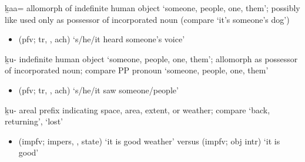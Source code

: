 \begin{morphdesc}[resume*=alphalist]
\item[ḵaa=]
	allomorph of indefinite human object  ‘someone, people, one, them’;
	possibly like  used only as possessor of incorporated noun
		(compare  ‘it’s someone’s dog’)
	\begin{itemize}
	\item	{} (pfv; tr, , ach) ‘s/he/it heard someone’s voice’
	\end{itemize}

\item[ḵu-]
	indefinite human object ‘someone, people, one, them’;
	allomorph  as possessor of incorporated noun;
	compare PP pronoun  ‘someone, people, one, them’
	\begin{itemize}
	\item	{} (pfv; tr, , ach) ‘s/he/it saw someone/people’
	\end{itemize}

\item[ḵu-]
	areal prefix indicating space, area, extent, or weather;
	compare  ‘back, returning’,  ‘lost’
	\begin{itemize}
	\item	{} (impfv; impers, ,  state) ‘it is good weather’\newline
		versus  (impfv; obj intr) ‘it is good’
	\end{itemize}
\end{morphdesc}

